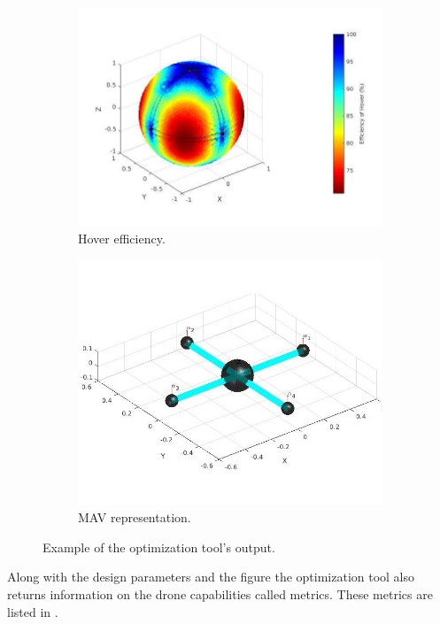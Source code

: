 \begin{figure}[!h]
\begin{subfigure}[b]{0.48\textwidth}
    \includegraphics[width=\linewidth]{images/n=4_hover.jpg}
    \caption{Hover efficiency.} \label{fig:tool_outputc}
  \end{subfigure}
  \hspace*{\fill} %
  \begin{subfigure}[b]{0.48\textwidth}
    \includegraphics[width=\linewidth]{images/n=4_model.jpg}
    \caption{MAV representation.} \label{fig:tool_outputd}
  \end{subfigure}
  \caption{Example of the optimization tool's output.}
  \label{fig:tool_output}
\end{figure}

Along with the design parameters and the figure the optimization tool also
returns information on the drone capabilities called metrics. These metrics are
listed in .

